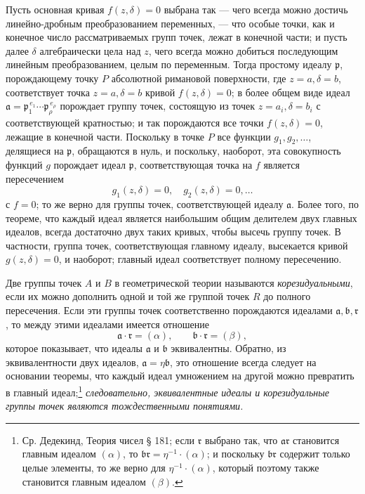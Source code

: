 \documentclass[11pt]{article}
\providecommand{\fra}{\mathfrak a}
\providecommand{\frb}{\mathfrak b}
\providecommand{\frp}{\mathfrak p}
\providecommand{\frr}{\mathfrak r}
\begin{document}
Пусть основная кривая \(f(z,\delta)=0\) выбрана так --- чего всегда можно достичь линейно-дробным преобразованием переменных, --- что особые точки, как и конечное число рассматриваемых групп точек, лежат в конечной части; и пусть далее \(\delta\) алгебраически цела над \(z\), чего всегда можно добиться последующим линейным преобразованием, целым по переменным. Тогда простому идеалу \(\frp\), порождающему точку \(P\) абсолютной римановой поверхности, где \(z=a,\delta=b\), соответствует точка \(z=a,\delta=b\) кривой \(f(z,\delta)=0\); в более общем виде идеал \(\fra=\frp_1^{\,e_1}\cdots\frp_\rho^{\,e_\rho}\) порождает группу точек, состоящую из точек \(z=a_i,\delta=b_i\) с соответствующей кратностью; и так порождаются все точки \(f(z,\delta)=0\), лежащие в конечной части. Поскольку в точке \(P\) все функции \(g_1,g_2,\ldots\), делящиеся на \(\frp\), обращаются в нуль, и поскольку, наоборот, эта совокупность функций \(g\) порождает идеал \(\frp\), соответствующая точка на \(f\) является пересечением
\[
g_1(z,\delta)=0,\quad g_2(z,\delta)=0,\ldots
\]
с \(f=0\); то же верно для группы точек, соответствующей идеалу \(\fra\). Более того, по теореме, что каждый идеал является наибольшим общим делителем двух главных идеалов, всегда достаточно двух таких кривых, чтобы высечь группу точек. В частности, группа точек, соответствующая главному идеалу, высекается кривой \(g(z,\delta)=0\), и наоборот; главный идеал соответствует полному пересечению.

Две группы точек \(A\) и \(B\) в геометрической теории называются \emph{корезидуальными}, если их можно дополнить одной и той же группой точек \(R\) до полного пересечения. Если эти группы точек соответственно порождаются идеалами \(\fra,\frb,\frr\), то между этими идеалами имеется отношение
\[
\fra\cdot\frr=(\alpha),\qquad \frb\cdot\frr=(\beta),
\]
которое показывает, что идеалы \(\fra\) и \(\frb\) эквивалентны. Обратно, из эквивалентности двух идеалов, \(\fra=\eta\frb\), это отношение всегда следует на основании теоремы, что каждый идеал умножением на другой можно превратить в главный идеал;\footnote{Ср. Дедекинд, Теория чисел § 181; если \(\frr\) выбрано так, что \(\fra\frr\) становится главным идеалом \((\alpha)\), то \(\frb\frr=\eta^{-1}\cdot(\alpha)\); и поскольку \(\frb\frr\) содержит только целые элементы, то же верно для \(\eta^{-1}\cdot(\alpha)\), который поэтому также становится главным идеалом \((\beta)\).} \emph{следовательно, эквивалентные идеалы и корезидуальные группы точек являются тождественными понятиями.}
\end{document}
